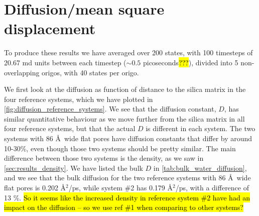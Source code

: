 \section{Diffusion/mean square displacement}




To produce these results we have averaged over 200 states, with 100 timesteps of 20.67 md units between each timestep ($\sim 0.5$ picoseconds\hl{???}), divided into 5 non-overlapping origos, with 40 states per origo.

We first look at the diffusion as function of distance to the silica matrix in the four reference systems, which we have plotted in \cref{fig:diffusion_reference_systems}. We see that the diffusion constant, $D$, has similar quantitative behaviour as we move further from the silica matrix in all four reference systems, but that the actual $D$ is different in each system. The two systems with 86 \AA\ wide flat pores have diffusion constants that differ by around 10-30\%, even though those two systems should be pretty similar. The main difference between those two systems is the density, as we saw in \cref{sec:results_density}. We have listed the bulk $D$ in \cref{tab:bulk_water_diffusion}, and we see that the bulk diffusion for the two reference systems with 86 \AA\ wide flat pores is {0.202 \AA$^2$/ps}, while system \#2 has {0.179 \AA$^2$/ps}, with a difference of {13 \%}. \hl{So it seems like the increased density in reference system \#2 have had an impact on the diffusion -- so we use ref \#1 when comparing to other systems?}
%
%

